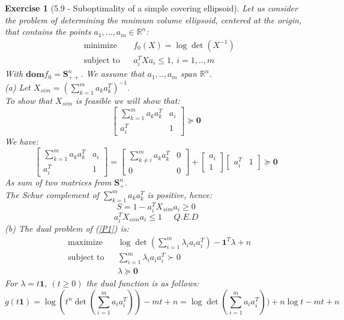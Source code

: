 \documentclass[11pt]{article}
\theoremstyle{exo}
\newtheorem*{exercise}{Exercise}
\newcommand{\R}{\mathbb{R}}
\newcommand{\Symd}{\mathbf{S}^n_{++}}
\newcommand{\Syms}{\mathbf{S}^n_{+}}
\newcommand{\1}{\mathbf{1}}
\newcommand{\0}{\mathbf{0}}
\begin{document}
\begin{exercise}[5.9 - Suboptimality of a simple covering ellipsoid]
Let us consider the problem of determining the mnimum volume ellipsoid, centered at the origin, that contains the points $a_1,...,a_m\in\R^n$:
\begin{equation}
\label{P1}
\begin{aligned}
& {\text{minimize}} & & f_0(X)=\log\det(X^{-1})\\
& \text{subject to} & & a_i^TXa_i\leq 1,\:i=1,..,m
\end{aligned}
\end{equation}
With $\mathbf{dom} f_0=\Symd$. We assume that $a_1,..,a_m$ span $\R^n$.\\
(a) Let $X_{sim}=\left(\sum\limits_{k=1}^ma_ka_k^T\right)^{-1}$.\\
To show that $X_{sim}$ is feasible we will show that:
\[\begin{bmatrix}\sum\limits_{k=1}^ma_ka_k^T&a_i\\a_i^T&1\end{bmatrix}\succeq \0\]
We have:
\[\begin{bmatrix}\sum\limits_{k=1}^ma_ka_k^T&a_i\\a_i^T&1\end{bmatrix}=\begin{bmatrix}\sum\limits_{k\neq i}^ma_ka_k^T&0\\0&0\end{bmatrix}+\begin{bmatrix}a_i\\1\end{bmatrix}\begin{bmatrix}a_i^T&1\end{bmatrix}\succeq \0\]
As sum of two matrices from $\Syms$.\\
The Schur complement of $\sum\limits_{k=1}^ma_ka_k^T$ is positive, hence:
\[S=1-a_i^TX_{sim}a_i\geq0\]
\[a_i^TX_{sim}a_i\leq1\phantom{abc}Q.E.D\]
(b) The dual problem of (\ref{P1}) is:
\begin{equation*}
\begin{aligned}
& {\text{maximize}} & & \log\det(\sum\limits_{i=1}^m\lambda_ia_ia_i^T)-\1^T\lambda+n\\
& \text{subject to} & & \sum\limits_{i=1}^m\lambda_ia_ia_i^T\succ 0\\
& & & \lambda\succeq \0
\end{aligned}
\end{equation*}
For $\lambda=t\1$, $(t\geq0)$ the dual function is as follows:
\[g(t\1)=\log(t^n\det(\sum\limits_{i=1}^ma_ia_i^T))-mt+n=\log\det(\sum\limits_{i=1}^ma_ia_i^T))+n\log t-mt+n\]

\end{exercise}
\end{document}
